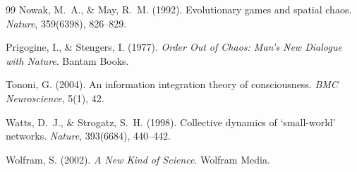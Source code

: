 \documentclass[12pt,a4paper]{article}
\begin{document}
\begin{thebibliography}{99}
Nowak, M.~A., \& May, R.~M. (1992).
Evolutionary games and spatial chaos.
\textit{Nature}, 359(6398), 826--829.

Prigogine, I., \& Stengers, I. (1977).
\textit{Order Out of Chaos: Man's New Dialogue with Nature}.
Bantam Books.

Tononi, G. (2004).
An information integration theory of consciousness.
\textit{BMC Neuroscience}, 5(1), 42.

Watts, D.~J., \& Strogatz, S.~H. (1998).
Collective dynamics of `small-world' networks.
\textit{Nature}, 393(6684), 440--442.

Wolfram, S. (2002).
\textit{A New Kind of Science}.
Wolfram Media.

\end{thebibliography}
\end{document}
